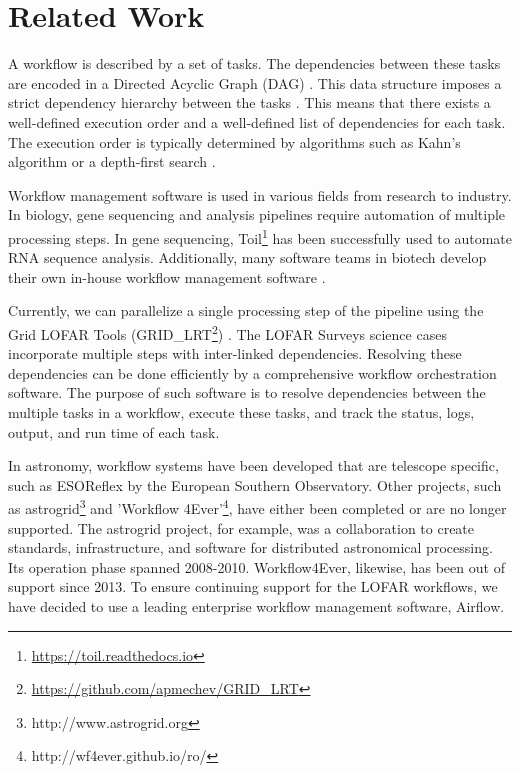 \section{Related Work}\label{sec:related}

A workflow is described by a set of tasks. The dependencies between these tasks are encoded in a Directed Acyclic Graph (DAG) \cite{dag}. This data structure imposes a strict dependency hierarchy between the tasks \cite{dagalgos}. This means that there exists a well-defined execution order and a well-defined list of dependencies for each task. The execution order is typically determined by algorithms such as Kahn's algorithm \cite{Kahn} or a depth-first search \cite{dfs}.

Workflow management software is used in various fields from research to industry. In biology, gene sequencing and analysis pipelines require automation of multiple processing steps. In gene sequencing, Toil\footnote{\url{https://toil.readthedocs.io}} has been successfully used to automate RNA sequence analysis\cite{toil}. Additionally, many  software teams in biotech develop their own in-house workflow management software \cite{nextflow}.  


Currently, we can parallelize a single processing step of the pipeline using the Grid LOFAR Tools (GRID\_LRT\footnote{\url{https://github.com/apmechev/GRID_LRT}}) \cite{mechev17}. The LOFAR Surveys science cases incorporate multiple steps with inter-linked dependencies. Resolving these dependencies can be done efficiently by a comprehensive workflow orchestration software. The purpose of such software is to resolve dependencies between the multiple tasks in a workflow, execute these tasks, and track the status, logs, output, and run time of each task. 

In astronomy, workflow systems have been developed that are telescope specific, such as ESOReflex\cite{reflex} by the European Southern Observatory. Other projects, such as astrogrid\footnote{http://www.astrogrid.org} and 'Workflow 4Ever'\footnote{http://wf4ever.github.io/ro/}, have either been completed or are no longer supported. The astrogrid project, for example, was a collaboration to create standards, infrastructure, and software for distributed astronomical processing. Its operation phase spanned 2008-2010. Workflow4Ever, likewise, has been out of support since 2013. To ensure continuing support for the LOFAR workflows, we have decided to use a leading enterprise workflow management software, Airflow.

